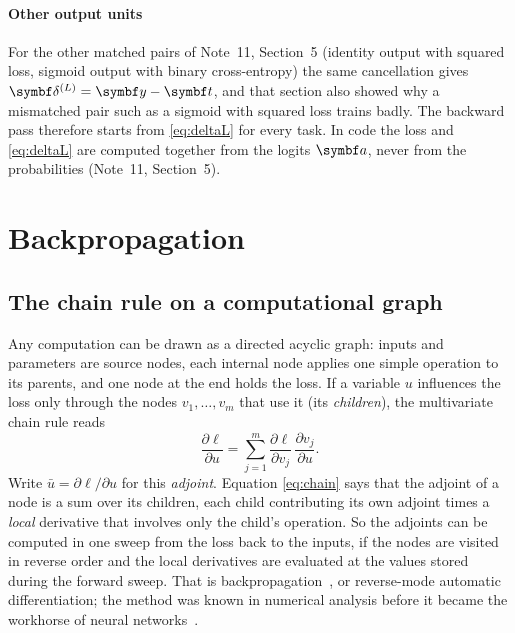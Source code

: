 \documentclass[11pt]{article}
\newcommand{\av}{\vect{a}}
\newcommand{\yv}{\vect{y}}
\newcommand{\tvec}{\vect{t}}
\newcommand{\dv}{\vect{\delta}}
\begin{document}
\paragraph{Other output units} For the other matched pairs of Note~11, Section~5 (identity output with squared loss,
sigmoid output with binary cross-entropy) the same cancellation gives $\dv^{(L)} = \yv - \tvec$, and that section also
showed why a mismatched pair such as a sigmoid with squared loss trains badly. The backward pass therefore starts from
\eqref{eq:deltaL} for every task. In code the loss and \eqref{eq:deltaL} are computed together from the logits $\av$,
never from the probabilities (Note~11, Section~5).

\section{Backpropagation}\label{sec:backprop}

\subsection{The chain rule on a computational graph}\label{sec:graph}

Any computation can be drawn as a directed acyclic graph: inputs and parameters are source nodes, each internal node
applies one simple operation to its parents, and one node at the end holds the loss. If a variable $u$ influences
the loss only through the nodes $v_1, \dots, v_m$ that use it (its \emph{children}), the multivariate chain rule
reads
\begin{equation}\label{eq:chain}
  \frac{\partial \ell}{\partial u} = \sum_{j=1}^m \frac{\partial \ell}{\partial v_j}\,\frac{\partial v_j}{\partial u} .
\end{equation}
Write $\bar{u} = \partial\ell/\partial u$ for this \emph{adjoint}. Equation \eqref{eq:chain} says that the adjoint of a
node is a sum over its children, each child contributing its own adjoint times a \emph{local} derivative that involves
only the child's operation. So the adjoints can be computed in one sweep from the loss back to the inputs, if the
nodes are visited in reverse order and the local derivatives are evaluated at the values stored during the forward
sweep. That is backpropagation~\cite{rumelhart1986}, or reverse-mode automatic differentiation; the method was known in
numerical analysis before it became the workhorse of neural networks~\cite{baydin2018}.
\end{document}
